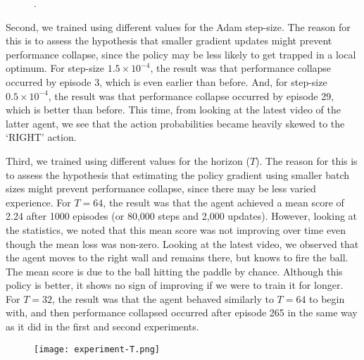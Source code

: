 \documentclass[12pt,a4paper]{article}
\begin{document}
\begin{figure}[ht]
    \centering
    \hfill
    \caption{.}
\end{figure}

Second, we trained using different values for the Adam step-size. The reason for this is to assess the hypothesis that smaller gradient updates might prevent performance collapse, since the policy may be less likely to get trapped in a local optimum. For step-size $1.5 \times 10^{-4}$, the result was that performance collapse occurred by episode 3, which is even earlier than before. And, for step-size $0.5 \times 10^{-4}$, the result was that performance collapse occurred by episode 29, which is better than before. This time, from looking at the latest video of the latter agent, we see that the action probabilities became heavily skewed to the `RIGHT' action. 

Third, we trained using different values for the horizon ($T$). The reason for this is to assess the hypothesis that estimating the policy gradient using smaller batch sizes might prevent performance collapse, since there may be less varied experience. For $T=64$, the result was that the agent achieved a mean score of 2.24 after 1000 episodes (or 80,000 steps and 2,000 updates). However, looking at the statistics, we noted that this mean score was not improving over time even though the mean loss was non-zero. Looking at the latest video, we observed that the agent moves to the right wall and remains there, but knows to fire the ball. The mean score is due to the ball hitting the paddle by chance. Although this policy is better, it shows no sign of improving if we were to train it for longer. For $T=32$, the result was that the agent behaved similarly to $T=64$ to begin with, and then performance collapsed occurred after episode 265 in the same way as it did in the first and second experiments.

\begin{figure}[ht]
\centering
\texttt{[image: experiment-T.png]}
\end{figure}
\end{document}
